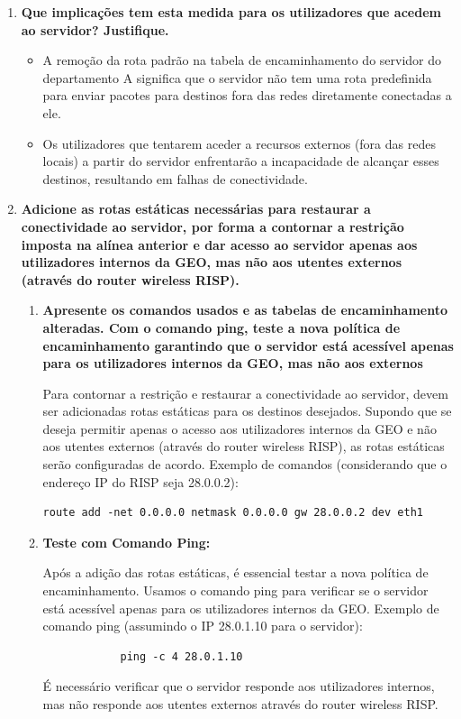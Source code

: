 \documentclass{article}
\begin{document}
\begin{enumerate}
    \item \textbf{Que implicações tem esta medida para os utilizadores que acedem ao servidor? Justifique.}

    \begin{itemize}
        \item A remoção da rota padrão na tabela de encaminhamento do servidor do departamento A significa que o servidor não tem uma rota predefinida para enviar pacotes para destinos fora das redes diretamente conectadas a ele.
        \item Os utilizadores que tentarem aceder a recursos externos (fora das redes locais) a partir do servidor enfrentarão a incapacidade de alcançar esses destinos, resultando em falhas de conectividade.
    \end{itemize}

    \item \textbf{Adicione as rotas estáticas necessárias para restaurar a conectividade ao servidor, por forma a contornar a restrição imposta na alínea anterior e dar acesso ao servidor apenas aos utilizadores internos da GEO, mas não aos utentes externos (através do router wireless RISP).}

    \begin{enumerate}
        \item \textbf{Apresente os comandos usados e as tabelas de encaminhamento alteradas. Com o comando ping, teste a nova política de encaminhamento garantindo que o servidor está acessível apenas para os utilizadores internos da GEO, mas não aos externos}


        Para contornar a restrição e restaurar a conectividade ao servidor, devem ser adicionadas rotas estáticas para os destinos desejados. Supondo que se deseja permitir apenas o acesso aos utilizadores internos da GEO e não aos utentes externos (através do router wireless RISP), as rotas estáticas serão configuradas de acordo. Exemplo de comandos (considerando que o endereço IP do RISP seja 28.0.0.2):
        
        \begin{verbatim}
route add -net 0.0.0.0 netmask 0.0.0.0 gw 28.0.0.2 dev eth1
\end{verbatim}
    
        \item \textbf{Teste com Comando Ping:}

        Após a adição das rotas estáticas, é essencial testar a nova política de encaminhamento. Usamos o comando ping para verificar se o servidor está acessível apenas para os utilizadores internos da GEO. 
        Exemplo de comando ping (assumindo o IP 28.0.1.10 para o servidor):
        
        \begin{verbatim}
            ping -c 4 28.0.1.10
        \end{verbatim}
    
        É necessário verificar que o servidor responde aos utilizadores internos, mas não responde aos utentes externos através do router wireless RISP.
    \end{enumerate}
\end{enumerate}
\end{document}
